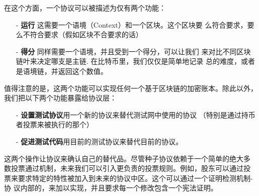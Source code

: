 \documentclass[letterpaper]{article}
\begin{document}
在这个方面，一个协议可以被描述为仅有两个功能：
\begin{itemize}
\item[-] \textbf{运行} 这需要一个语境（Context）和一个区块。这个区块要
  么符合要求，要么不符合要求（假如区块不合要求的话）
\item[-] \textbf{得分} 同样需要一个语境，并且受到一个得分，可以让我们
  来对比不同区块链叶来决定哪支是主链. 在比特币里，我们仅仅是简单地记录
  总的难度，或者是语境链，并返回这个数值。
\end{itemize}

值得注意的是，这两个功能可以实现任何一个基于区块链的加密账本。除此以外，
我们把以下两个功能暴露给协议层：

\begin{itemize}
\item[-] \textbf{设置测试协议}用一个新的协议来替代测试网中使用的协议
  （特别是通过持币者投票来被执行的那个）
\item[-] \textbf{促进测试代码}用目前的测试协议来替代目前的协议。
\end{itemize}

这两个操作让协议来确认自己的替代品。尽管种子协议依赖于一个简单的绝大多
数投票通过机制，未来我们可以引入更负责的投票规则。例如，股东可以通过投
票来要求特定的特性被加入到未来的协议中区。这个可以通过一个证明检测机制-协
议内部的，来加以实现，并且要求每一个修改包含一个宪法证明。
\end{document}
